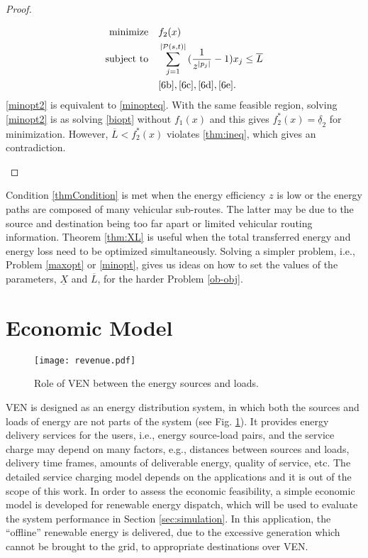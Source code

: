 \documentclass[journal]{IEEEtran}
\begin{document}
\begin{proof}
\begin{enumerate}
		\begin{subequations}
		\label{minopt2}
		\begin{align}
		\text{minimize}\quad 	& f_2(x)\\
		\text{subject to}\quad 
		& \sum_{j=1}^{|\mathcal{P}(s,t)|}{(\frac{1}{z^{|p_j|}}-1)   x_j} \leq \overline{L} \label{min2a}\\
		& \eqref{6b}, \eqref{6c}, \eqref{6d}, \eqref{6e}.
		\end{align}
		\end{subequations}	
			\eqref{minopt2} is equivalent to \eqref{minopteq}. With the same feasible region, solving \eqref{minopt2} is as solving \eqref{biopt} without $f_1(x)$ and this gives $f_2^*(x)=\underline{\delta}_2$ for minimization. However, $\overline{L}<f_2^*(x)$ violates \eqref{thm:ineq}, which gives an contradiction.
\end{enumerate}
\end{proof}
Condition \eqref{thmCondition} is met when the energy efficiency $z$ is low or the energy paths are composed of many vehicular sub-routes. The latter may be due to the source and destination being too far apart or limited vehicular routing information.
Theorem \ref{thm:XL} is useful when the total transferred energy and energy loss need to be optimized simultaneously. 
Solving a simpler problem, i.e., Problem \ref{maxopt} or \ref{minopt}, gives us ideas on how to set the values of the parameters, $\underline{X}$ and $\overline{L}$, for the harder  Problem \ref{ob-obj}.

\section{Economic Model} \label{sec:economic}
\begin{figure}[!t]
\centering
\texttt{[image: revenue.pdf]}\vspace{-0.5cm}
\caption{Role of VEN between the energy sources and loads.}
\label{fig:revenue}
\end{figure}

VEN is designed as an energy distribution system, in which both the sources and loads of energy are not parts of the system (see Fig. \ref{fig:revenue}). It provides energy delivery services for the users, i.e., energy source-load pairs, and the service charge may depend on many factors, e.g., distances between sources and loads, delivery time frames, amounts of deliverable energy, quality of service, etc. The detailed service charging model depends on the applications and it is out of the scope of this work. In order to assess the economic feasibility, a simple economic model is developed for renewable energy dispatch, which will be used to evaluate the system performance in Section \ref{sec:simulation}. In this application, the ``offline'' renewable energy is delivered, due to the excessive generation which cannot be brought to the grid, to appropriate destinations over VEN.
\end{document}
